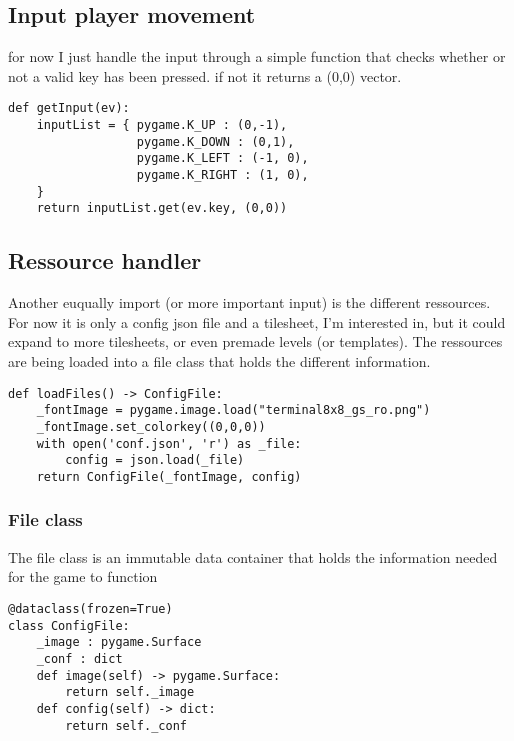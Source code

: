 \documentclass[11pt]{article}
\begin{document}
\subsection{Input player movement}
\label{sec:orgcc40204}

for now I just handle the input through a simple function that checks whether or not a valid key has been pressed. if not it returns a (0,0) vector. 

\begin{verbatim}
def getInput(ev):
    inputList = { pygame.K_UP : (0,-1),
                  pygame.K_DOWN : (0,1),
                  pygame.K_LEFT : (-1, 0),
                  pygame.K_RIGHT : (1, 0),
    }
    return inputList.get(ev.key, (0,0))
\end{verbatim}





\subsection{Ressource handler}
\label{sec:orgf832be1}

Another euqually import (or more important input) is the different ressources. For now it is only a config json file and a tilesheet, I'm interested in, but it could expand to more tilesheets, or even premade levels (or templates). The ressources are being loaded into a file class that holds the different information.

\begin{verbatim}
def loadFiles() -> ConfigFile:
    _fontImage = pygame.image.load("terminal8x8_gs_ro.png")
    _fontImage.set_colorkey((0,0,0))
    with open('conf.json', 'r') as _file:
        config = json.load(_file)
    return ConfigFile(_fontImage, config)
\end{verbatim}

\subsubsection{File class}
\label{sec:org86f23f5}

The file class is an immutable data container that holds the information needed for the game to function

\begin{verbatim}
@dataclass(frozen=True)
class ConfigFile:
    _image : pygame.Surface
    _conf : dict
    def image(self) -> pygame.Surface:
        return self._image
    def config(self) -> dict:
        return self._conf
\end{verbatim}
\end{document}

